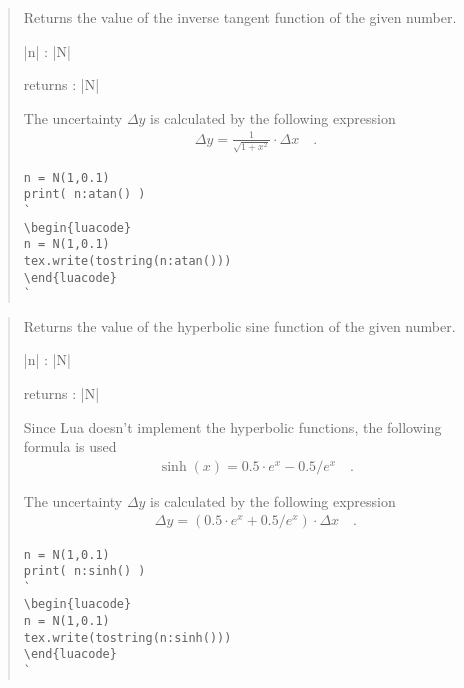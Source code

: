 \documentclass{ltxdoc}
\begin{document}
\begin{quote}
  Returns the value of the inverse tangent function of the given number.

  \begin{description}
  \item |n| : |N|

  \item returns : |N|
  \end{description}

  The uncertainty $\Delta y$ is calculated by the following expression
  \begin{align*}
    \Delta y = \frac{1}{\sqrt{1 + x^2}} \cdot \Delta x \quad.
  \end{align*}


\begin{lstlisting}
n = N(1,0.1)
print( n:atan() )
`
\begin{luacode}
n = N(1,0.1)
tex.write(tostring(n:atan()))
\end{luacode}
`
\end{lstlisting}

\end{quote}


\begin{quote}
  Returns the value of the hyperbolic sine function of the given number.

  \begin{description}
  \item |n| : |N|

  \item returns : |N|
  \end{description}

  Since Lua doesn't implement the hyperbolic functions, the following formula is used
  \begin{align*}
    \sinh(x) = 0.5 \cdot e^x - 0.5 / e^x  \quad.
  \end{align*}

  The uncertainty $\Delta y$ is calculated by the following expression
  \begin{align*}
    \Delta y = \left( 0.5 \cdot e^x + 0.5 / e^x \right) \cdot \Delta x \quad.
  \end{align*}


\begin{lstlisting}
n = N(1,0.1)
print( n:sinh() )
`
\begin{luacode}
n = N(1,0.1)
tex.write(tostring(n:sinh()))
\end{luacode}
`
\end{lstlisting}

\end{quote}
\end{document}
